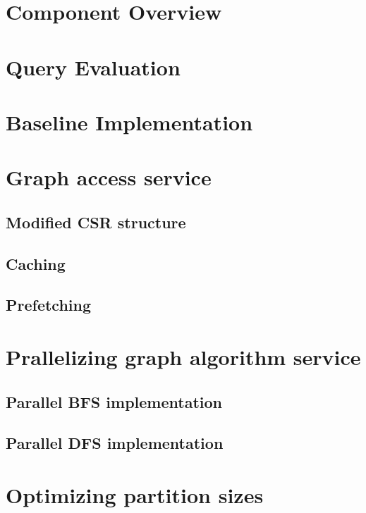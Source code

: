 \section{Component Overview}\label{sec:componentOverview}
\section{Query Evaluation}\label{sec:queryEvaluation}
\section{Baseline Implementation}\label{sec:baseline}
\section{Graph access service}\label{sec:graphAccess}
\subsection{Modified CSR structure}
\subsection{Caching}
\subsection{Prefetching}
\section{Prallelizing graph algorithm service}\label{sec:parallelAlgorithms}
\subsection{Parallel BFS implementation}
\subsection{Parallel DFS implementation}
\section{Optimizing partition sizes}\label{sec:partitionSize}
